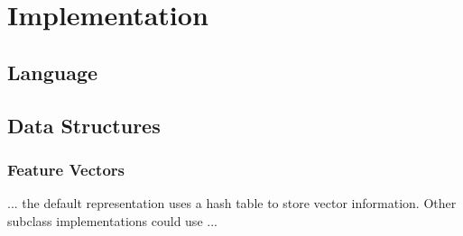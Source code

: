 
\chapter{Implementation}
\label{Implementation}

\section{Language}
\section{Data Structures}
\subsection{Feature Vectors}
\label{imp-featurevectors}


... the default representation uses a hash table to store vector
information.  Other subclass implementations could use ...
